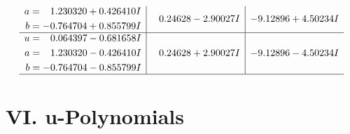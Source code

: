 \documentclass[1p]{elsarticle_modified}
\theoremstyle{definition}
\begin{document}
$$\begin{array}{c|c|c}
\begin{aligned}
a &= \phantom{-}1.230320 + 0.426410 I \\
b &= -0.764704 + 0.855799 I\end{aligned}
 & \phantom{-}0.24628 - 2.90027 I & -9.12896 + 4.50234 I \\ \hline\begin{aligned}
u &= \phantom{-}0.064397 - 0.681658 I \\
a &= \phantom{-}1.230320 - 0.426410 I \\
b &= -0.764704 - 0.855799 I\end{aligned}
 & \phantom{-}0.24628 + 2.90027 I & -9.12896 - 4.50234 I\\
 \hline 
 \end{array}$$\newpage
\newpage\renewcommand{\arraystretch}{1}
\centering \section*{ VI. u-Polynomials}
\end{document}

